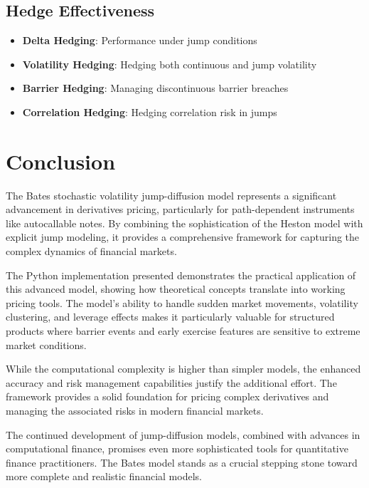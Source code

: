 \documentclass[12pt,a4paper]{article}
\begin{document}
\subsection{Hedge Effectiveness}

\begin{itemize}
    \item \textbf{Delta Hedging}: Performance under jump conditions
    \item \textbf{Volatility Hedging}: Hedging both continuous and jump volatility
    \item \textbf{Barrier Hedging}: Managing discontinuous barrier breaches
    \item \textbf{Correlation Hedging}: Hedging correlation risk in jumps
\end{itemize}

\section{Conclusion}

The Bates stochastic volatility jump-diffusion model represents a significant advancement in derivatives pricing, particularly for path-dependent instruments like autocallable notes. By combining the sophistication of the Heston model with explicit jump modeling, it provides a comprehensive framework for capturing the complex dynamics of financial markets.

The Python implementation presented demonstrates the practical application of this advanced model, showing how theoretical concepts translate into working pricing tools. The model's ability to handle sudden market movements, volatility clustering, and leverage effects makes it particularly valuable for structured products where barrier events and early exercise features are sensitive to extreme market conditions.

While the computational complexity is higher than simpler models, the enhanced accuracy and risk management capabilities justify the additional effort. The framework provides a solid foundation for pricing complex derivatives and managing the associated risks in modern financial markets.

The continued development of jump-diffusion models, combined with advances in computational finance, promises even more sophisticated tools for quantitative finance practitioners. The Bates model stands as a crucial stepping stone toward more complete and realistic financial models.
\end{document}
